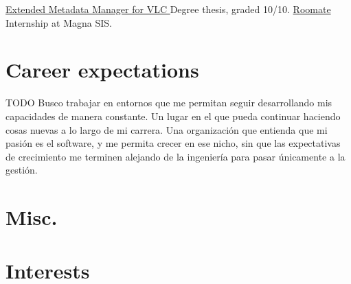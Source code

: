 \documentclass[letterpaper]{twentysecondcv} %
\begin{document}
\begin{twenty} %
    	{\href{https://github.com/ASantosVal/EMM_for_VLC}
    	{Extended Metadata Manager for VLC \faExternalLink} }
    	{}
    	{Degree thesis, graded 10/10.}
    	{\href{https://roomate-magnarenove.herokuapp.com/}
    	{Roomate \faExternalLink} }
    	{}
    	{Internship at Magna SIS.}
\end{twenty}


\section{Career expectations}

TODO
Busco trabajar en entornos que me permitan seguir desarrollando mis capacidades de manera constante. Un lugar en el que pueda continuar haciendo cosas nuevas a lo largo de mi carrera. Una organización que entienda que mi pasión es el software, y me permita crecer en ese nicho, sin que las expectativas de crecimiento me terminen alejando de la ingeniería para pasar únicamente a la gestión.


\section{Misc.}

\begin{customList} %
\end{customList}


\section{Interests}
\end{document}
